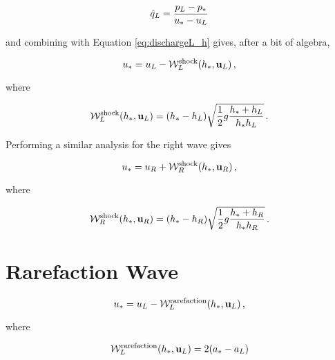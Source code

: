\begin{equation}
  \hat{q}_L = \frac{p_L - p_*}
    {u_* - u_L}
\end{equation}

and combining with Equation \eqref{eq:dischargeL_h} gives, after a bit of
algebra,

\begin{equation}\label{eq:ustarLshock}
  u_* = u_L
    - \mathcal{W}^{\text{shock}}_L(h_*,\mathbf{u}_L)
    \,,
\end{equation}

where

\begin{equation}
  \mathcal{W}^{\text{shock}}_L(h_*,\mathbf{u}_L)
    = (h_* - h_L)
    \sqrt{\frac{1}{2}g\frac{h_* + h_L}{h_*h_L}}
    \,.
\end{equation}

Performing a similar analysis for the right wave gives

\begin{equation}\label{eq:ustarRshock}
  u_* = u_R
    + \mathcal{W}^{\text{shock}}_R(h_*,\mathbf{u}_R)
    \,,
\end{equation}

where

\begin{equation}
  \mathcal{W}^{\text{shock}}_R(h_*,\mathbf{u}_R)
    = (h_* - h_R)
    \sqrt{\frac{1}{2}g\frac{h_* + h_R}{h_*h_R}}
    \,.
\end{equation}

\section{Rarefaction Wave}
\begin{equation}\label{eq:ustarLrarefaction}
  u_* = u_L
    - \mathcal{W}^{\text{rarefaction}}_L(h_*,\mathbf{u}_L)
    \,,
\end{equation}

where

\begin{equation}
  \mathcal{W}_L^{\text{rarefaction}}(h_*,\mathbf{u}_L)
    = 2(a_* - a_L)
\end{equation}

